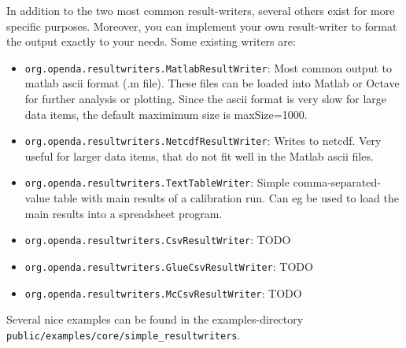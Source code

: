 In addition to the two most common result-writers, several others exist for
more specific purposes. Moreover, you can implement your own result-writer to
format the output exactly to your needs. Some existing writers are:
\begin{itemize}
\item {\tt org.openda.resultwriters.MatlabResultWriter}: Most common output to
matlab ascii format (.m file). These files can be loaded into Matlab or Octave
for further analysis or plotting. Since the ascii format is very slow for large
data items, the default maximimum size is maxSize=1000.
\item {\tt org.openda.resultwriters.NetcdfResultWriter}: Writes to netcdf.
Very useful for larger data items, that do not fit well in the Matlab ascii
files.
\item {\tt org.openda.resultwriters.TextTableWriter}: Simple
comma-separated-value table with main results of a calibration run. Can eg be
used to load the main results into a spreadsheet program.
\item {\tt org.openda.resultwriters.CsvResultWriter}: TODO
\item {\tt org.openda.resultwriters.GlueCsvResultWriter}: TODO
\item {\tt org.openda.resultwriters.McCsvResultWriter}: TODO
\end{itemize}


Several nice examples can be found in the examples-directory\\
{\tt public/examples/core/simple\_resultwriters}.
